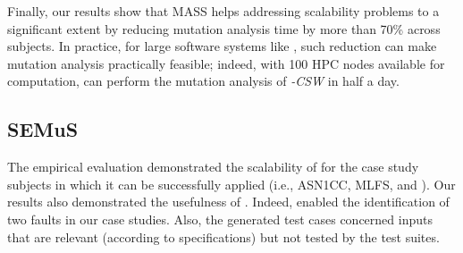 Finally, our results show that MASS helps addressing scalability problems to a significant extent by reducing mutation analysis time by more than 70\% across subjects. 
In practice, for large software systems like \SAIL{}, such reduction can make mutation analysis practically feasible; indeed, with 100 HPC nodes available for computation, \MASS can perform the mutation analysis of \SAIL{}\emph{-CSW} in half a day. 




\subsection{SEMuS}

%

The empirical evaluation demonstrated the scalability of \SEMUS for the case study subjects in which it can be successfully applied (i.e., ASN1CC, MLFS, and \UTIL). 
Our results also demonstrated the usefulness of \SEMUS. Indeed, \SEMUS enabled the identification of two faults in our case studies. Also, the generated test cases concerned inputs that are relevant (according to specifications) but not tested by the test suites.

